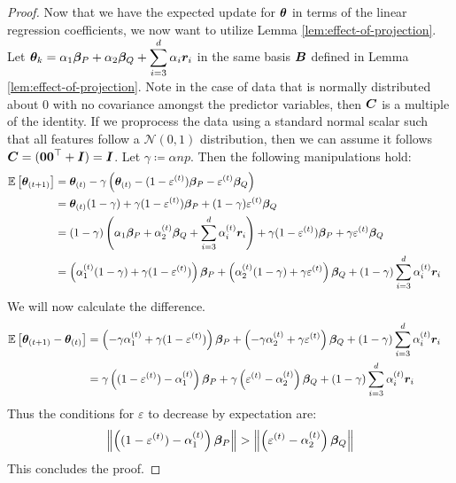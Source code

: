 \documentclass{article} %
\newcommand{\norm}[1]{\left\lVert#1\right\rVert}
\begin{document}
\begin{appendices}
\begin{proof}
		\endgroup
		Now that we have the expected update for ${\bm{\theta}}$ in terms of the linear regression coefficients, we now want to utilize Lemma \ref{lem:effect-of-projection}.\\
		Let $\displaystyle {\bm{\theta}}_k = \alpha_1{\bm{\beta}}_P + \alpha_2{\bm{\beta}}_Q + \sum_{i=3}^{d}\alpha_i {\bm{r}}_i$ in the same basis ${\bm{B}}$ defined in Lemma \ref{lem:effect-of-projection}. Note in the case of data that is normally distributed about $0$ with no covariance amongst the predictor variables, then ${\bm{C}}$ is a multiple of the identity. If we proprocess the data using a standard normal scalar such that all features follow a $\mathcal{N}(0,1)$ distribution, then we can assume it follows $\displaystyle {\bm{C}} = ({\bm{0}}{\bm{0}}^\top + {\bm{I}}) = {\bm{I}}$. Let $\gamma \coloneqq \alpha np$. Then the following manipulations hold:
		\begin{align*}
			\mathbb{E}\left[{\bm{\theta}}_{(t+1)}\right] &= {\bm{\theta}}_{(t)} - \gamma\left({\bm{\theta}}_{(t)} - (1-\varepsilon^{(t)}){\bm{\beta}}_P - \varepsilon^{(t)} {\bm{\beta}}_Q\right) &&\\
			&= {\bm{\theta}}_{(t)}(1-\gamma) + \gamma (1-\varepsilon^{(t)}){\bm{\beta}}_P + (1-\gamma)\varepsilon^{(t)}{\bm{\beta}}_Q &&\\
			&= (1-\gamma)\left(\alpha_1 {\bm{\beta}}_P + \alpha_2^{(t)} {\bm{\beta}}_Q + \sum_{i=3}^d\alpha_i^{(t)}{\bm{r}}_i\right) + \gamma(1-\varepsilon^{(t)}){\bm{\beta}}_P + \gamma\varepsilon^{(t)}{\bm{\beta}}_Q &&\\
			&= \left(\alpha_1^{(t)}(1-\gamma) + \gamma(1-\varepsilon^{(t)})\right){\bm{\beta}}_P + \left(\alpha_2^{(t)}(1-\gamma) + \gamma \varepsilon^{(t)}\right){\bm{\beta}}_Q + (1-\gamma)\sum_{i=3}^d\alpha_i^{(t)}{\bm{r}}_i &&
		\end{align*}
		We will now calculate the difference. 
		\begin{align*}
			\mathbb{E}\left[{\bm{\theta}}_{(t+1)} - {\bm{\theta}}_{(t)}\right] &= \left(-\gamma\alpha_1^{(t)} + \gamma(1-\varepsilon^{(t)})\right){\bm{\beta}}_P + \left(-\gamma \alpha_2^{(t)} + \gamma \varepsilon^{(t)}\right){\bm{\beta}}_Q + (1-\gamma)\sum_{i=3}^d\alpha_i^{(t)}{\bm{r}}_i &&\\
			&= \gamma\left((1-\varepsilon^{(t)}) - \alpha_1^{(t)}\right){\bm{\beta}}_P + \gamma\left(\varepsilon^{(t)} - \alpha_2^{(t)}\right){\bm{\beta}}_Q + (1-\gamma)\sum_{i=3}^d\alpha_i^{(t)}{\bm{r}}_i &&
		\end{align*}
		Thus the conditions for $\varepsilon$ to decrease by expectation are:
		\begin{equation}
			\norm{\left((1-\varepsilon^{(t)}) - \alpha_1^{(t)}\right)\vbeta_P} > \norm{\left(\varepsilon^{(t)} - \alpha_2^{(t)}\right)\vbeta_Q}
		\end{equation}  
		This concludes the proof. 
	\end{proof}


\end{appendices}
\end{document}

